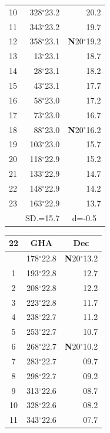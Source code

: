 \documentclass[10pt, a4paper]{report}
\begin{document}
\begin{scriptsize}
\begin{tabular*}{0.2\textwidth}[t]{@{\extracolsep{\fill}}|c|rr|}
10 & 328$^\circ$23.2 & 20.2\\
11 & 343$^\circ$23.2 & 19.7\\[2Pt]
12 & 358$^\circ$23.1 & \textbf{N}20$^\circ$19.2\\
13 & 13$^\circ$23.1 & 18.7\\
14 & 28$^\circ$23.1 & 18.2\\
15 & 43$^\circ$23.1 & \raisebox{0.24ex}{\boldmath$\cdot$~\boldmath$\cdot$~~}17.7\\
16 & 58$^\circ$23.0 & 17.2\\
17 & 73$^\circ$23.0 & 16.7\\[2Pt]
18 & 88$^\circ$23.0 & \textbf{N}20$^\circ$16.2\\
19 & 103$^\circ$23.0 & 15.7\\
20 & 118$^\circ$22.9 & 15.2\\
21 & 133$^\circ$22.9 & \raisebox{0.24ex}{\boldmath$\cdot$~\boldmath$\cdot$~~}14.7\\
22 & 148$^\circ$22.9 & 14.2\\
23 & 163$^\circ$22.9 & 13.7\\
\hline
\rule{0pt}{2.4ex} & \multicolumn{1}{c}{SD.=15.7} & \multicolumn{1}{c|}{d=-0.5}\\
\hline
\end{tabular*}\noindent
\begin{tabular*}{0.2\textwidth}[t]{@{\extracolsep{\fill}}|c|rr|}
\hline
\multicolumn{1}{|c|}{\rule{0pt}{2.6ex}\textbf{22}} & \multicolumn{1}{c}{\textbf{GHA}} & \multicolumn{1}{c|}{\textbf{Dec}}\\
\hline\rule{0pt}{2.6ex}\noindent
0 & 178$^\circ$22.8 & \textbf{N}20$^\circ$13.2\\
1 & 193$^\circ$22.8 & 12.7\\
2 & 208$^\circ$22.8 & 12.2\\
3 & 223$^\circ$22.8 & \raisebox{0.24ex}{\boldmath$\cdot$~\boldmath$\cdot$~~}11.7\\
4 & 238$^\circ$22.7 & 11.2\\
5 & 253$^\circ$22.7 & 10.7\\[2Pt]
6 & 268$^\circ$22.7 & \textbf{N}20$^\circ$10.2\\
7 & 283$^\circ$22.7 & 09.7\\
8 & 298$^\circ$22.7 & 09.2\\
9 & 313$^\circ$22.6 & \raisebox{0.24ex}{\boldmath$\cdot$~\boldmath$\cdot$~~}08.7\\
10 & 328$^\circ$22.6 & 08.2\\
11 & 343$^\circ$22.6 & 07.7\\[2Pt]

\end{tabular*}
\end{scriptsize}
\end{document}
